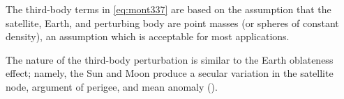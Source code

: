 The third-body terms in \ref{eq:mont337} are based on the assumption that the
satellite, Earth, and perturbing body are point masses (or spheres of constant 
density), an assumption which is acceptable for most applications.

The nature of the third-body perturbation is similar to the Earth oblateness
effect; namely, the Sun and Moon produce a secular variation in the satellite node,
argument of perigee, and mean anomaly (\cite{tapley}).

